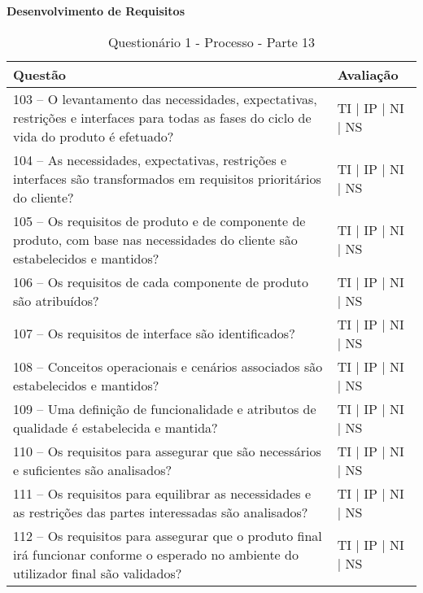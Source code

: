 \documentclass[openany,10pt,a4paper]{article}
\begin{document}
\begin{appendix}
\begin{table}[h]
\textbf{Desenvolvimento de Requisitos}
	\centering
	\caption{Questionário 1 - Processo - Parte 13}
	\begin{tabular}{p{3.5in}p{2in}}		
		\toprule
		\textbf{Questão}  & \textbf{Avaliação}\\ 
		\midrule
		103 – O levantamento das necessidades, expectativas, restrições e interfaces para todas as fases 
do ciclo de vida do produto é efetuado?
 & TI | IP | NI | NS \\
        \midrule
		104 – As necessidades, expectativas, restrições e interfaces são transformados em requisitos 
prioritários do cliente?
 & TI | IP | NI | NS \\
		\midrule
		105 – Os requisitos de produto e de componente de produto, com base nas necessidades do 
cliente são estabelecidos e mantidos?
 & TI | IP | NI | NS \\
		\midrule
        106 – Os requisitos de cada componente de produto são atribuídos?
 & TI | IP | NI | NS \\
		\midrule
		107 – Os requisitos de interface são identificados?
  & TI | IP | NI | NS \\
		\midrule
		108 – Conceitos operacionais e cenários associados são estabelecidos e mantidos?
 & TI | IP | NI | NS \\
 \midrule
		109 – Uma definição de funcionalidade e atributos de qualidade é estabelecida e mantida?
 & TI | IP | NI | NS \\
 \midrule
	110 – Os requisitos para assegurar que são necessários e suficientes são analisados?
 & TI | IP | NI | NS \\
 \midrule
		111 – Os requisitos para equilibrar as necessidades e as restrições das partes interessadas são 
analisados?
 & TI | IP | NI | NS \\
        \midrule
		112 – Os requisitos para assegurar que o produto final irá funcionar conforme o esperado no 
ambiente do utilizador final são validados?
 & TI | IP | NI | NS \\
		\bottomrule
	\end{tabular} 
	\label{tab:tabela1}
\end{table}


\end{appendix}
\end{document}

